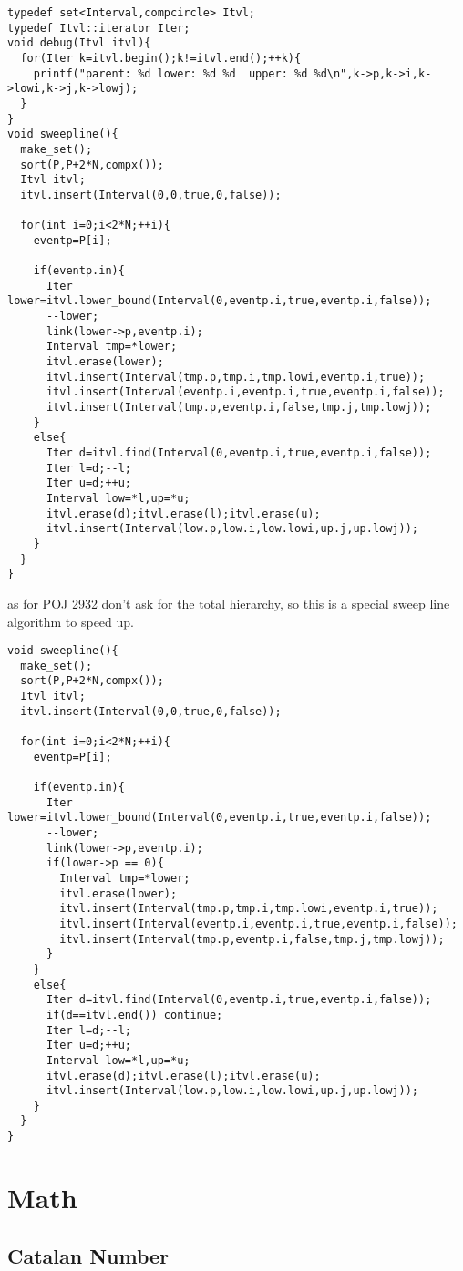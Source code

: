 \documentclass[a4paper]{article}
\begin{document}
\begin{lstlisting}
typedef set<Interval,compcircle> Itvl;
typedef Itvl::iterator Iter;
void debug(Itvl itvl){
  for(Iter k=itvl.begin();k!=itvl.end();++k){
    printf("parent: %d lower: %d %d  upper: %d %d\n",k->p,k->i,k->lowi,k->j,k->lowj);
  }
}
void sweepline(){
  make_set();
  sort(P,P+2*N,compx());
  Itvl itvl;
  itvl.insert(Interval(0,0,true,0,false));

  for(int i=0;i<2*N;++i){
    eventp=P[i];

    if(eventp.in){
      Iter lower=itvl.lower_bound(Interval(0,eventp.i,true,eventp.i,false));
      --lower;
      link(lower->p,eventp.i);
      Interval tmp=*lower;
      itvl.erase(lower);
      itvl.insert(Interval(tmp.p,tmp.i,tmp.lowi,eventp.i,true));
      itvl.insert(Interval(eventp.i,eventp.i,true,eventp.i,false));
      itvl.insert(Interval(tmp.p,eventp.i,false,tmp.j,tmp.lowj));
    }
    else{
      Iter d=itvl.find(Interval(0,eventp.i,true,eventp.i,false));
      Iter l=d;--l;
      Iter u=d;++u;
      Interval low=*l,up=*u;
      itvl.erase(d);itvl.erase(l);itvl.erase(u);
      itvl.insert(Interval(low.p,low.i,low.lowi,up.j,up.lowj));
    }
  }
}
\end{lstlisting}
as for POJ 2932 don't ask for the total hierarchy, so this is a
special sweep line algorithm to speed up.
\begin{lstlisting}
void sweepline(){
  make_set();
  sort(P,P+2*N,compx());
  Itvl itvl;
  itvl.insert(Interval(0,0,true,0,false));

  for(int i=0;i<2*N;++i){
    eventp=P[i];

    if(eventp.in){
      Iter lower=itvl.lower_bound(Interval(0,eventp.i,true,eventp.i,false));
      --lower;
      link(lower->p,eventp.i);
      if(lower->p == 0){
        Interval tmp=*lower;
        itvl.erase(lower);
        itvl.insert(Interval(tmp.p,tmp.i,tmp.lowi,eventp.i,true));
        itvl.insert(Interval(eventp.i,eventp.i,true,eventp.i,false));
        itvl.insert(Interval(tmp.p,eventp.i,false,tmp.j,tmp.lowj));
      }
    }
    else{
      Iter d=itvl.find(Interval(0,eventp.i,true,eventp.i,false));
      if(d==itvl.end()) continue;
      Iter l=d;--l;
      Iter u=d;++u;
      Interval low=*l,up=*u;
      itvl.erase(d);itvl.erase(l);itvl.erase(u);
      itvl.insert(Interval(low.p,low.i,low.lowi,up.j,up.lowj));
    }
  }
}
\end{lstlisting}
\section{Math}
\subsection{Catalan Number}
\end{document}
